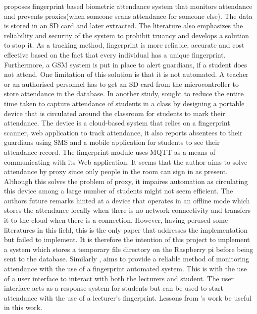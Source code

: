 \citeauthor{soe2018implementation} proposes fingerprint based biometric attendance system that monitors attendance and prevents proxies(when someone scans attendance for someone else). The data is stored in an SD card and later extracted. The literature also emphasizes the reliability and security of the system to prohibit truancy and develops a solution to stop it. As a tracking method, fingerprint is more reliable, accurate and cost effective based on the fact that every individual has a unique fingerprint. Furthermore, a GSM system is put in place to alert guardians, if a student does not attend. One limitation of this solution is that it is not automated. A teacher or an authorised personnel has to get an SD card from the microcontroller to store attendance in the database.\cite{soe2018implementation} In another study, \citeauthor{Rachna} sought to reduce the entire time taken to capture attendance of students in a class by designing a portable device that is circulated around the classroom for students to mark their attendance. The device is a cloud-based system that relies on a fingerprint scanner, web application to track attendance, it also reports absentees to their guardians using SMS and a mobile application for students to see their attendance record. The fingerprint module uses MQTT as a means of communicating with its Web application. It seems that the author aims to solve attendance by proxy since only people in the room can sign in as present. Although this solves the problem of proxy, it impaires automation as circulating this device among a large number of students might not seem efficient. The authors future remarks hinted at a device that operates in an offline mode which stores the attendance locally when there is no network connectivity and transfers it to the cloud when there is a connection.\cite{Rachna} However, having perused some literatures in this field, this is the only paper that addresses the implementation but failed to implement. It is therefore the intention of this project to implement a system which stores a temporary file directory on the Raspberry pi before being sent to the database. Similarly \citeauthor{Rahman2021}, aims to provide a reliable method of monitoring attendance with the use of a fingerprint automated system. This is with the use of a user interface to interact with both the lecturers and student. The user interface acts as a response system for students but can be used to start attendance with the use of a lecturer's fingerprint.\cite{Rahman2021} Lessons from \citeauthor{Rahman2021}'s work be useful in this work.

